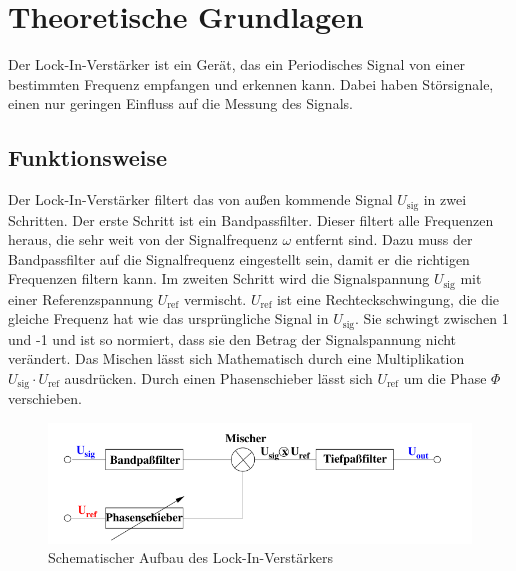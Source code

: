 \section{Theoretische Grundlagen}
Der Lock-In-Verstärker ist ein Gerät, das ein Periodisches Signal von einer bestimmten Frequenz empfangen und erkennen kann.
Dabei haben Störsignale, einen nur geringen Einfluss auf die Messung des Signals.
\subsection{Funktionsweise}
Der Lock-In-Verstärker filtert das von außen kommende Signal $U_\text{sig}$ in zwei Schritten.
Der erste Schritt ist ein Bandpassfilter.
Dieser filtert alle Frequenzen heraus, die sehr weit von der Signalfrequenz $\omega$ entfernt sind.
Dazu muss der Bandpassfilter auf die Signalfrequenz eingestellt sein, damit er die richtigen Frequenzen filtern kann.
Im zweiten Schritt wird die Signalspannung $U_\text{sig}$ mit einer Referenzspannung $U_\text{ref}$ vermischt.
$U_\text{ref}$ ist eine Rechteckschwingung, die die gleiche Frequenz hat wie das ursprüngliche Signal in $U_\text{sig}$.
Sie schwingt zwischen 1 und -1 und ist so normiert, dass sie den Betrag der Signalspannung nicht verändert.
Das Mischen lässt sich Mathematisch durch eine Multiplikation $U_\text{sig} \cdot U_\text{ref}$ ausdrücken.
Durch einen Phasenschieber lässt sich $U_\text{ref}$ um die Phase $\Phi$ verschieben.
\begin{figure}
    \includegraphics[width=\textwidth]{Abbildungen/Grundlegende_idee.png}
    \caption{Schematischer Aufbau des Lock-In-Verstärkers \cite[][]{man:v303}}
    \label{fig:grundlegende_Idee}
\end{figure}

